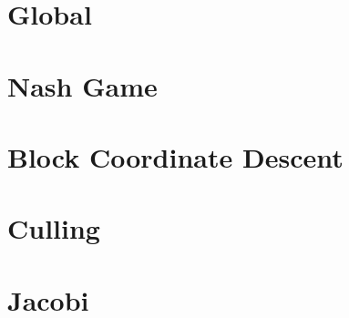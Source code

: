 \section{Global \label{sec:global}}

\section{Nash Game}

\section{Block Coordinate Descent}

\section{Culling \label{sec:culling}}

\section{Jacobi \label{sec:jacobi}}
